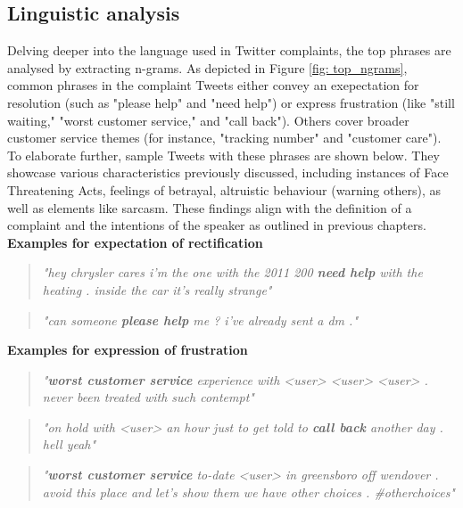 \subsection{Linguistic analysis}
Delving deeper into the language used in Twitter complaints, the top phrases are analysed by extracting n-grams. As depicted in Figure \ref{fig: top_ngrams}, common phrases in the complaint Tweets either convey an exepectation for resolution (such as "please help" and "need help") or express frustration (like "still waiting," "worst customer service," and "call back"). Others cover  broader customer service themes (for instance, "tracking number" and "customer care"). To elaborate further, sample Tweets with these phrases are shown below. They showcase various characteristics previously discussed, including instances of Face Threatening Acts, feelings of betrayal, altruistic behaviour (warning others), as well as elements like sarcasm. These findings align with the definition of a complaint and the intentions of the speaker as outlined in previous chapters.\\

\textbf{Examples for expectation of rectification}
\begin{quote}
    \textit{"hey chrysler cares i'm the one with the 2011 200 \textbf{need help} with the heating . inside the car it's really strange"}
\end{quote}
\begin{quote}
    \textit{"can someone \textbf{please help} me ? i've already sent a dm ."}
\end{quote}
\textbf{Examples for expression of frustration}
\begin{quote}
    \textit{"\textbf{worst customer service} experience with <user> <user> <user> . never been treated with such contempt"}
\end{quote}
\begin{quote}
    \textit{"on hold with <user> an hour just to get told to \textbf{call back} another day . hell yeah"}
\end{quote}
\begin{quote}
    \textit{"\textbf{worst customer service} to-date <user> in greensboro off wendover . avoid this place and let's show them we have other choices . \#otherchoices"}
\end{quote}

